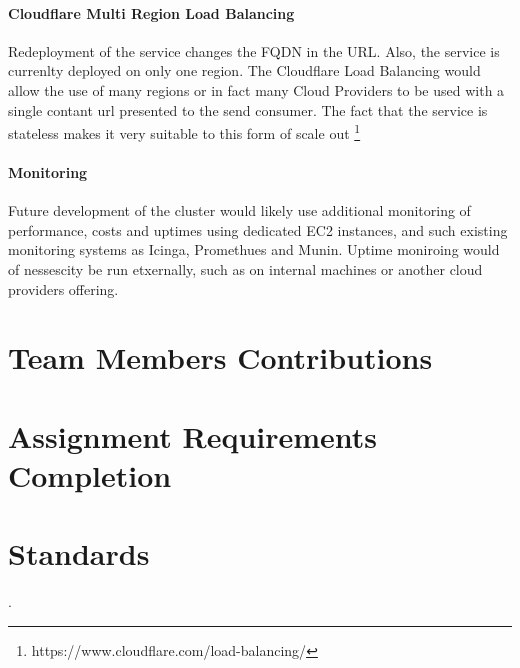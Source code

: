 \documentclass[conference]{IEEEtran}
\begin{document}
\paragraph{Cloudflare Multi Region Load Balancing}
Redeployment of the service changes the FQDN in the URL. Also, the service is currenlty deployed on only one region. The Cloudflare Load Balancing would allow the use of many regions or in fact many Cloud Providers to be used with a single contant url presented to the send consumer. The fact that the service is stateless makes it very suitable to this form of scale out \footnote{https://www.cloudflare.com/load-balancing/}
\paragraph{Monitoring}
Future development of the cluster would likely use additional monitoring of performance, costs and uptimes using dedicated EC2 instances, and such existing monitoring systems as Icinga, Promethues and Munin. Uptime moniroing would of nessescity be run etxernally, such as on internal machines or another cloud providers offering.
\section{Team Members Contributions}
\section{Assignment Requirements Completion}
\section{Standards}

.
\end{document}
